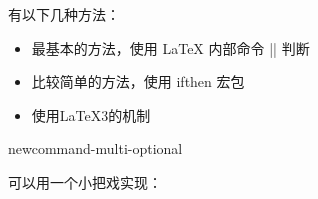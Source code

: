 










有以下几种方法：
\begin{itemize}
\item 最基本的方法，使用 \LaTeX{} 内部命令 |\@ifstar| 判断
\begin{texlist}
    \makeatletter
    \newcommand{\mycommand}{%
      \@ifstar
        \mycommandStar%
        \mycommandNoStar%
    }
    \makeatother
    \newcommand{\mycommandStar}{starred version}
    \newcommand{\mycommandNoStar}{normal version}
\end{texlist}
\item 比较简单的方法，使用 ifthen 宏包
\begin{texlist}
    \usepackage{ifthen}
    \newcommand{\mycommand}[1]{\ifthenelse{\equal{#1}{*}}%
      {\mycommandStar}%
      {\mycommandNoStar{#1}}%
    }
    \newcommand{\mycommandStar}{starred version}
    \newcommand{\mycommandNoStar}[1]{normal version}  
\end{texlist}
\item 使用\LaTeX{3}的机制
\begin{texlist}
    \usepackage{xparse}
    \NewDocumentCommand{}
\end{texlist}
\end{itemize}




{newcommand-multi-optional}

可以用一个小把戏实现：
\begin{texlist}
  \newcommand{\mycmd}[1][option1]{%
    \def\ArgI{{#1}}%
    \mycmdoptii
  }
  \newcommand\mycmdoptii[1][option2]{%
    ...
  }
\end{texlist}

